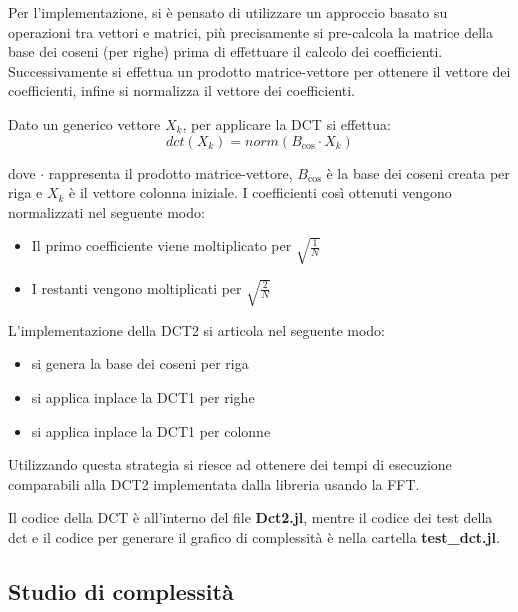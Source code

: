Per l'implementazione, si è pensato di utilizzare un approccio basato su operazioni
tra vettori e matrici, più precisamente si pre-calcola la matrice
della base dei coseni (per righe) prima di effettuare il calcolo dei coefficienti.
Successivamente si effettua un prodotto matrice-vettore per ottenere il vettore
dei coefficienti, infine si normalizza il vettore dei coefficienti.

Dato un generico vettore $X_k$, per applicare la DCT si effettua:
\begin{equation*}
    dct(X_k) = norm(B_{\cos}\cdot X_k )
\end{equation*}

dove $\cdot$ rappresenta il prodotto matrice-vettore, $B_{\cos}$
è la base dei coseni creata per riga e $X_k$ è il vettore colonna iniziale.
I coefficienti così ottenuti vengono normalizzati nel seguente modo:
\begin{itemize}
    \item Il primo coefficiente viene moltiplicato per $\sqrt{\frac{1}{N}}$
    \item I restanti vengono moltiplicati per $\sqrt{\frac{2}{N}}$
\end{itemize}

L'implementazione della DCT2 si articola nel seguente modo:
\begin{itemize}
    \item si genera la base dei coseni per riga
    \item si applica inplace la DCT1 per righe
    \item si applica inplace la DCT1 per colonne
\end{itemize}

Utilizzando questa strategia si riesce ad ottenere dei tempi di esecuzione
comparabili alla DCT2 implementata dalla libreria usando la FFT.

Il codice della DCT è all'interno del file \textbf{Dct2.jl}, mentre il codice dei
test della dct e il codice per generare il grafico di complessità è nella cartella
\textbf{test\_dct.jl}.


\subsection{Studio di complessità}

